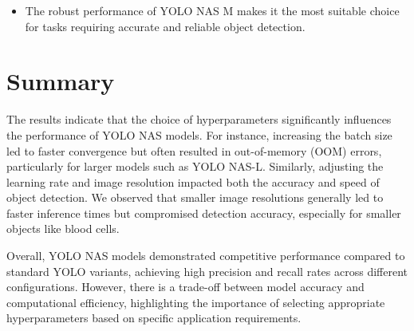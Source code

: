 \begin{itemize}
    \item The robust performance of YOLO NAS M makes it the most suitable choice for tasks requiring accurate and reliable object detection.
\end{itemize}





\clearpage
\section{Summary }

The results indicate that the choice of hyperparameters significantly influences the performance of YOLO NAS models. For instance, increasing the batch size led to faster convergence but often resulted in out-of-memory (OOM) errors, particularly for larger models such as YOLO NAS-L. Similarly, adjusting the learning rate and image resolution impacted both the accuracy and speed of object detection. We observed that smaller image resolutions generally led to faster inference times but compromised detection accuracy, especially for smaller objects like blood cells.

Overall, YOLO NAS models demonstrated competitive performance compared to standard YOLO variants, achieving high precision and recall rates across different configurations. However, there is a trade-off between model accuracy and computational efficiency, highlighting the importance of selecting appropriate hyperparameters based on specific application requirements.











